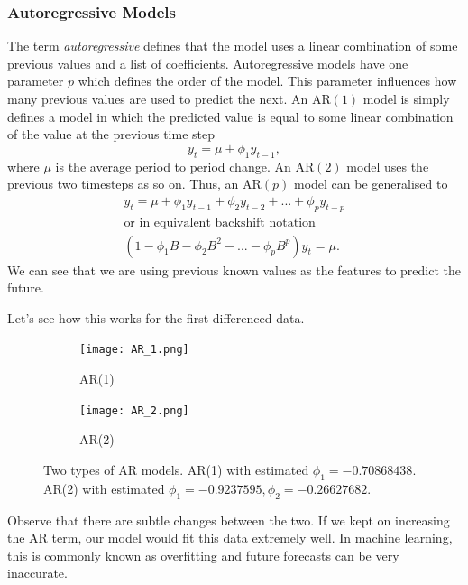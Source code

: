\documentclass{article}
\begin{document}
  \subsubsection{Autoregressive Models}
    The term \emph{autoregressive} defines that the model uses a linear combination of some previous values and a list of coefficients.
    Autoregressive models have one parameter $p$ which defines the order of the model. This parameter influences how many previous values are used to predict the next. 
    An AR$(1)$ model is simply defines a model in which the predicted value is equal to some linear combination of the value at the previous time step
    \begin{equation*}
      y_t = \mu + \phi_1 y_{t-1},
    \end{equation*}
    where $\mu$ is the average period to period change.
    An AR$(2)$ model uses the previous two timesteps as so on.
    Thus, an AR$(p)$ model can be generalised to
    \begin{gather*}
      y_t = \mu + \phi_1 y_{t-1} + \phi_2 y_{t-2} + ... + \phi_p y_{t-p}\\
      \text{or in equivalent backshift notation}\\
      (1 - \phi_1B - \phi_2B^2 - ... - \phi_pB^p)y_t = \mu.
    \end{gather*}
    We can see that we are using previous known values as the features to predict the future.

    Let's see how this works for the first differenced data.

    \begin{figure}[H]
      \centering
      \captionsetup{justification=centering}
      \begin{subfigure}[b]{0.49\linewidth}
        \texttt{[image: AR\_1.png]}
        \caption{AR(1)}
      \end{subfigure}
      \begin{subfigure}[b]{0.49\linewidth}
        \texttt{[image: AR\_2.png]}
        \caption{AR(2)}
      \end{subfigure}
      \caption{Two types of AR models. AR(1) with estimated $\phi_1 = -0.70868438$. AR(2) with estimated $\phi_1 = -0.9237595, \phi_2 =   -0.26627682$.}
    \end{figure}

    Observe that there are subtle changes between the two. If we kept on increasing the AR term, our model would fit this data extremely well. In machine learning, this is commonly known as overfitting and future forecasts can be very inaccurate.
\end{document}
